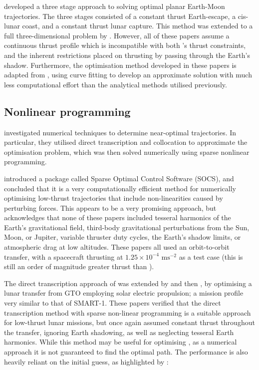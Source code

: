 \textcite{Pierson1994} developed a three stage approach to solving optimal planar Earth-Moon trajectories. The three stages consisted of a constant thrust Earth-escape, a cis-lunar coast, and a constant thrust lunar capture. This method was extended to a full three-dimensional problem by \textcite{Kluever1995,Kluever1996,Kluever1997}. However, all of these papers assume a continuous thrust profile which is incompatible with both \BW's thrust constraints, and the inherent restrictions placed on thrusting by passing through the Earth's shadow. Furthermore, the optimisation method developed in these papers is adapted from \textcite{Edelbaum1964}, using curve fitting to develop an approximate solution with much less computational effort than the analytical methods utilised previously.

\subsection{Nonlinear programming} \label{sub:NLP-lit}


\textcite{Betts1993} investigated numerical techniques to determine near-optimal trajectories. In particular, they utilised direct transcription and collocation to approximate the optimisation problem, which was then solved numerically using sparse nonlinear programming.
 
\textcite{Betts1994} introduced a package called Sparse Optimal Control Software (SOCS), and concluded that it is a very computationally efficient method for numerically optimising low-thrust trajectories that include non-linearities caused by perturbing forces. This appears to be a very promising approach, but \textcite{Betts2000} acknowledges that none of these papers included tesseral harmonics of the Earth's gravitational field, third-body gravitational perturbations from the Sun, Moon, or Jupiter, variable thruster duty cycles, the Earth's shadow limits, or atmospheric drag at low altitudes. These papers all used an orbit-to-orbit transfer, with a spacecraft thrusting
 at $1.25\times10^{-4}\text{ ms}^{-2}$ as a test case (this is still an order of magnitude greater thrust than \BW).

The direct transcription approach of \textcite{Betts1993} was extended by \textcite{Erb_thesis} and then \textcite{Betts2003}, by optimising a lunar transfer from GTO employing solar electric propulsion; a mission profile very similar to that of SMART-1. These papers verified that the direct transcription method with sparse non-linear programming is a suitable approach for low-thrust lunar missions, but once again assumed constant thrust throughout the transfer, ignoring Earth shadowing, as well as neglecting tesseral Earth harmonics. While this method may be useful for optimising \BW, as a numerical approach it is not guaranteed to find the optimal path. The performance is also heavily reliant on the initial guess, as highlighted by \textcite{Betts2003}: 

